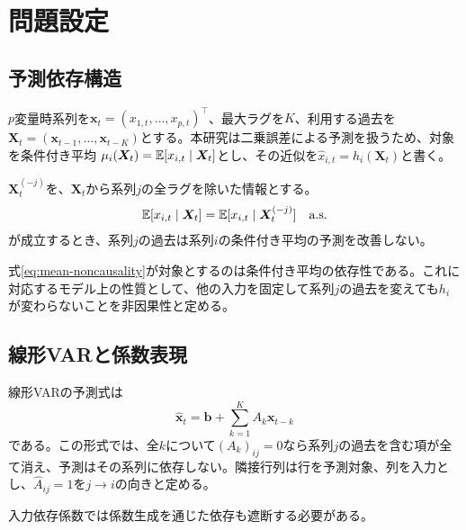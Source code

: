 \section{問題設定}
\label{sec:problem}


\subsection{予測依存構造}
\(p\)変量時系列を\(\bm x_t=(x_{1,t},\ldots,x_{p,t})^\top\)、最大ラグを\(K\)、利用する過去を\(\bm X_t=(\bm x_{t-1},\ldots,\bm x_{t-K})\)とする。本研究は二乗誤差による予測を扱うため、対象を条件付き平均
\(\mu_i(\bm X_t)=\mathbb{E}[x_{i,t}\mid\bm X_t]\)とし、その近似を\(\widehat x_{i,t}=h_i(\bm X_t)\)と書く。

\begin{definition}[条件付き平均に関する非因果性]
\(\bm X_t^{(-j)}\)を、\(\bm X_t\)から系列\(j\)の全ラグを除いた情報とする。
\begin{equation}
 \mathbb{E}[x_{i,t}\mid\bm X_t]
 =
 \mathbb{E}[x_{i,t}\mid\bm X_t^{(-j)}]
 \quad\text{a.s.}
 \label{eq:mean-noncausality}
\end{equation}
が成立するとき、系列\(j\)の過去は系列\(i\)の条件付き平均の予測を改善しない。
\end{definition}

式\eqref{eq:mean-noncausality}が対象とするのは条件付き平均の依存性である。これに対応するモデル上の性質として、他の入力を固定して系列\(j\)の過去を変えても\(h_i\)が変わらないことを非因果性と定める。

\subsection{線形VARと係数表現}
線形VARの予測式は
\begin{equation}
 \widehat{\bm x}_t=\bm b+\sum_{k=1}^{K}A_k\bm x_{t-k}
 \label{eq:linear-var}
\end{equation}
である。この形式では、全\(k\)について\((A_k)_{ij}=0\)なら系列\(j\)の過去を含む項が全て消え、予測はその系列に依存しない。隣接行列は行を予測対象、列を入力とし、\(\widehat A_{ij}=1\)を\(j\to i\)の向きと定める。

入力依存係数では係数生成を通じた依存も遮断する必要がある。
